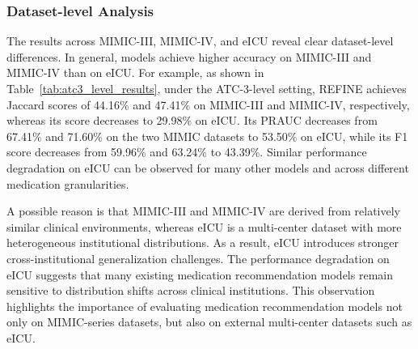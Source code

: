 \documentclass[manuscript,review]{acmart}
\begin{document}

\subsubsection{Dataset-level Analysis}
The results across MIMIC-III, MIMIC-IV, and eICU reveal clear dataset-level differences. In general, models achieve higher accuracy on MIMIC-III and MIMIC-IV than on eICU. For example, as shown in Table~\ref{tab:atc3_level_results}, under the ATC-3-level setting, REFINE achieves Jaccard scores of 44.16\% and 47.41\% on MIMIC-III and MIMIC-IV, respectively, whereas its score decreases to 29.98\% on eICU. Its PRAUC decreases from 67.41\% and 71.60\% on the two MIMIC datasets to 53.50\% on eICU, while its F1 score decreases from 59.96\% and 63.24\% to 43.39\%. Similar performance degradation on eICU can be observed for many other models and across different medication granularities.


A possible reason is that MIMIC-III and MIMIC-IV are derived from relatively similar clinical environments, whereas eICU is a multi-center dataset with more heterogeneous institutional distributions. As a result, eICU introduces stronger cross-institutional generalization challenges. The performance degradation on eICU suggests that many existing medication recommendation models remain sensitive to distribution shifts across clinical institutions. This observation highlights the importance of evaluating medication recommendation models not only on MIMIC-series datasets, but also on external multi-center datasets such as eICU.
\end{document}
